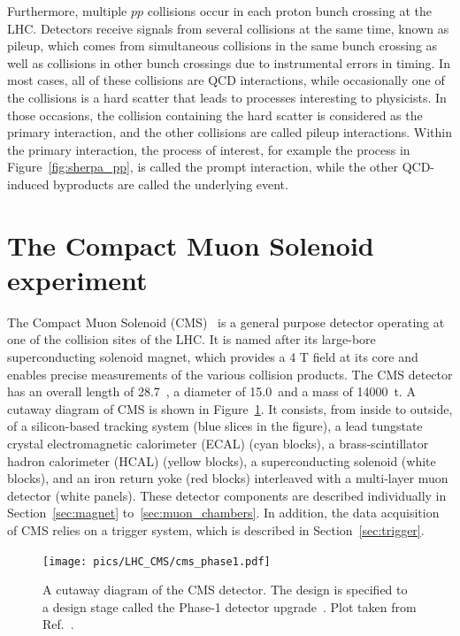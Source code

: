 Furthermore, multiple $pp$ collisions occur in each proton bunch crossing at the LHC.
Detectors receive signals from several collisions at the same time, known as pileup, 
which comes from simultaneous collisions in the same bunch crossing as well as collisions in other bunch crossings due to instrumental errors in timing. 
In most cases, all of these collisions are QCD interactions, 
while occasionally one of the collisions is a hard scatter that leads to processes interesting to physicists.
In those occasions, the collision containing the hard scatter is considered as the primary interaction, 
and the other collisions are called pileup interactions.
Within the primary interaction, the process of interest, for example the \ttH process in Figure~\ref{fig:sherpa_pp},
is called the prompt interaction, while the other QCD-induced byproducts are called the underlying event.



\section{The Compact Muon Solenoid experiment}\label{sec:cms}


The Compact Muon Solenoid (CMS)~\cite{Collaboration_2008} is a general purpose detector operating at one of the collision sites of the LHC.
It is named after its large-bore superconducting solenoid magnet, 
which provides a 4 T field at its core and enables precise measurements of the various collision products.
The CMS detector has an overall length of 28.7~\meter, a diameter of 15.0~\meter and a mass of 14000~t.
A cutaway diagram of CMS is shown in Figure~\ref{fig:cms_detector}.
It consists, from inside to outside, of a silicon-based tracking system (blue slices in the figure), 
a lead tungstate crystal electromagnetic calorimeter (ECAL) (cyan blocks),
a brass-scintillator hadron calorimeter (HCAL) (yellow blocks),
a superconducting solenoid (white blocks), 
and an iron return yoke (red blocks) interleaved with a multi-layer muon detector (white panels).
These detector components are described individually in Section~\ref{sec:magnet} to~\ref{sec:muon_chambers}.
In addition, the data acquisition of CMS relies on a trigger system, which is described in Section~\ref{sec:trigger}.

\begin{figure}[!htb]
    \centering
    \captionsetup{justification=justified}
    \texttt{[image: pics/LHC\_CMS/cms\_phase1.pdf]}
    \caption{A cutaway diagram of the CMS detector. 
             The design is specified to a design stage called the Phase-1 detector upgrade~\cite{arXiv:2012.14304, Mans:1481837,Tapper:1556311}.
             Plot taken from Ref.~\cite{Sakuma:2665537}.}
    \label{fig:cms_detector}
\end{figure}

